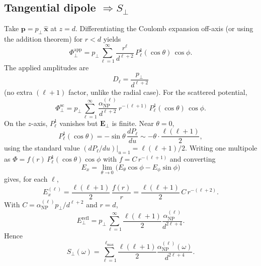 \documentclass[11pt,a4paper]{article}
\theoremstyle{definition}
\newcommand{\alphanp}{\alpha_{\text{NP}}}
\newcommand{\p}{\mathbf{p}}
\begin{document}
\subsection{Tangential dipole $\Rightarrow S_\perp$}

\noindent
Take $\p = p_\perp\,\hat{\mathbf{x}}$ at $z=d$. Differentiating the Coulomb expansion off-axis (or using the addition theorem) for $r<d$ yields
\begin{equation}
  \Phi_\perp^{\mathrm{app}}
  =
  p_\perp
  \sum_{\ell=1}^{\infty}
  \frac{r^{\ell}}{d^{\ell+2}}\,
  P_\ell^1(\cos\theta)\,\cos\phi.
  \label{eq:Phi-perp-app}
\end{equation}
The applied amplitudes are
\begin{equation}
  D_\ell
  =
  \frac{p_\perp}{d^{\ell+2}}
  \label{eq:D-ell-perp}
\end{equation}
(no extra $(\ell+1)$ factor, unlike the radial case). For the scattered potential,
\begin{equation}
  \Phi_\perp^{\mathrm{sc}}
  =
  p_\perp
  \sum_{\ell=1}^{\infty}
  \frac{\alphanp^{(\ell)}}{d^{\ell+2}}\,
  r^{-(\ell+1)}\,
  P_\ell^1(\cos\theta)\,\cos\phi.
  \label{eq:Phi-perp-sc}
\end{equation}
On the $z$-axis, $P_\ell^1$ vanishes but $\mathbf{E}_\perp$ is finite. Near $\theta=0$,
\begin{equation}
  P_\ell^1(\cos\theta)
  =
  -\sin\theta\,\frac{dP_\ell}{du}
  \sim
  -\theta\cdot\frac{\ell(\ell+1)}{2},
\end{equation}
using the standard value $(dP_\ell/du)|_{u=1}=\ell(\ell+1)/2$. Writing one multipole as $\Phi=f(r)\,P_\ell^1(\cos\theta)\cos\phi$ with $f=C\,r^{-(\ell+1)}$ and converting
\begin{equation}
  E_x
  =
  \lim_{\theta\to 0}
  \bigl(E_\theta\cos\phi - E_\phi\sin\phi\bigr)
\end{equation}
gives, for each $\ell$,
\begin{equation}
  E_x^{(\ell)}
  =
  \frac{\ell(\ell+1)}{2}\,\frac{f(r)}{r}
  =
  \frac{\ell(\ell+1)}{2}\, C\, r^{-(\ell+2)}.
\end{equation}
With $C=\alphanp^{(\ell)}p_\perp/d^{\ell+2}$ and $r=d$,
\begin{equation}
  E_\perp^{\mathrm{refl}}
  =
  p_\perp
  \sum_{\ell=1}^{\infty}
  \frac{\ell(\ell+1)}{2}
  \frac{\alphanp^{(\ell)}}{d^{2\ell+4}}.
\end{equation}
Hence
\begin{equation}
  S_\perp(\omega)
  =
  \sum_{\ell=1}^{\ell_{\max}}
  \frac{\ell(\ell+1)}{2}
  \frac{\alphanp^{(\ell)}(\omega)}{d^{2\ell+4}}.
  \label{eq:S-perp-multi}
\end{equation}
\end{document}
